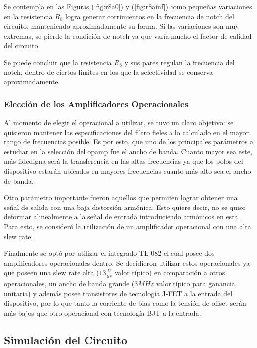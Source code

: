 \documentclass[a4paper]{article}
\begin{document}
Se contempla en las Figuras (\ref{fig:r8a0}) y (\ref{fig:r8ainf}) como pequeñas variaciones en la resistencia $R_8$ logra generar corrimientos en la frecuencia de notch del circuito, manteniendo aproximadamente su forma. Si las variaciones son muy extremas, se pierde la condición de notch ya que varía mucho el factor de calidad del circuito.

Se puede concluir que la resistencia $R_8$ y sus pares regulan la frecuencia del notch, dentro de ciertos límites en los que la selectividad se conserva aproximadamente.

\subsubsection{Elección de los Amplificadores Operacionales}

Al momento de elegir el operacional a utilizar, se tuvo un claro objetivo: se quisieron mantener las especificaciones del filtro fieles a lo calculado en el mayor rango de frecuencias posible. Es por esto, que uno de los principales parámetros a estudiar en la selección del opamp fue el ancho de banda. Cuanto mayor sea este, más fidedigna será la transferencia en las altas frecuencias ya que los polos del dispositivo estarán ubicados en mayores frecuencias cuanto más alto sea el ancho de banda.

Otro parámetro importante fueron aquellos que permiten lograr obtener una señal de salida con una baja distorsión armónica. Esto quiere decir, no se quiso deformar alinealmente a la señal de entrada introduciendo armónicos en esta. Para esto, se consideró la utilización de un amplificador operacional con una alta slew rate.

Finalmente se optó por utilizar el integrado TL-082 el cual posee dos amplificadores operacionales dentro. Se decidieron utilizar estos operacionales ya que poseen una slew rate alta ($13\frac{V}{\mu s}$ valor típico) en comparación a otros operacionales, un ancho de banda grande ($3MHz$ valor típico para ganancia unitaria) y además posee transistores de tecnología J-FET a la entrada del dispositivo, por lo que tanto la corriente de bias como la tensión de offset serán más bajos que otro operacional con tecnología BJT a la entrada.

\subsection{Simulación del Circuito}
\label{sec:simulacion}
\end{document}
